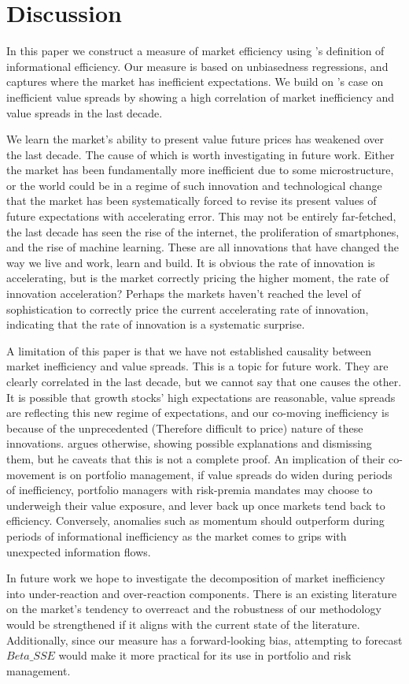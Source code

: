 \section{Discussion}
\label{sec:conclusion}

In this paper we construct a measure of market efficiency using \citet{fama_EMH}'s definition of informational efficiency. Our measure is based on unbiasedness
regressions, and captures where the market has inefficient expectations. We build on \citet{asness_2024}'s case on inefficient
value spreads by showing a high correlation of market inefficiency and value spreads in the last decade.

We learn the market's ability to present value future prices has weakened over the last decade. The cause of which is worth investigating
in future work. Either the market has been fundamentally more inefficient due to some microstructure, or the world could be in a regime of such innovation and technological change that the market has been systematically forced to revise its
present values of future expectations with accelerating error. This may not be entirely far-fetched, the last decade has seen the rise of the internet,
the proliferation of smartphones, and the rise of machine learning. These are all innovations that have changed the way we live and work, learn and build.
It is obvious the rate of innovation is accelerating, but is the market correctly pricing the higher moment, the rate of innovation acceleration?
Perhaps the markets haven't reached the level of sophistication to correctly price the current accelerating rate of innovation, indicating that
the rate of innovation is a systematic surprise. 

A limitation of this paper is that we have not established causality between market inefficiency and value spreads. This is a topic for future work.
They are clearly correlated in the last decade, but we cannot say that one causes the other. It is possible that 
growth stocks' high expectations are reasonable, value spreads are reflecting this new regime of expectations, and our co-moving inefficiency
is because of the unprecedented (Therefore difficult to price) nature of these innovations. \citet{asness_2024} argues otherwise, showing possible explanations and dismissing them, but he caveats that this
is not a complete proof. An implication of their co-movement is on portfolio management, if value spreads do widen during periods of inefficiency, portfolio managers with risk-premia mandates may choose to underweigh their value exposure, and lever back up once 
markets tend back to efficiency. Conversely, anomalies such as momentum should outperform during periods of informational inefficiency as the 
market comes to grips with unexpected information flows.

In future work we hope to investigate the decomposition of market inefficiency into under-reaction and over-reaction components.
There is an existing literature on the market's tendency to overreact and the robustness of our methodology would be strengthened if it aligns with
the current state of the literature. Additionally, since our measure has a forward-looking bias, attempting to forecast $Beta\_SSE$ would make it 
more practical for its use in portfolio and risk management.
